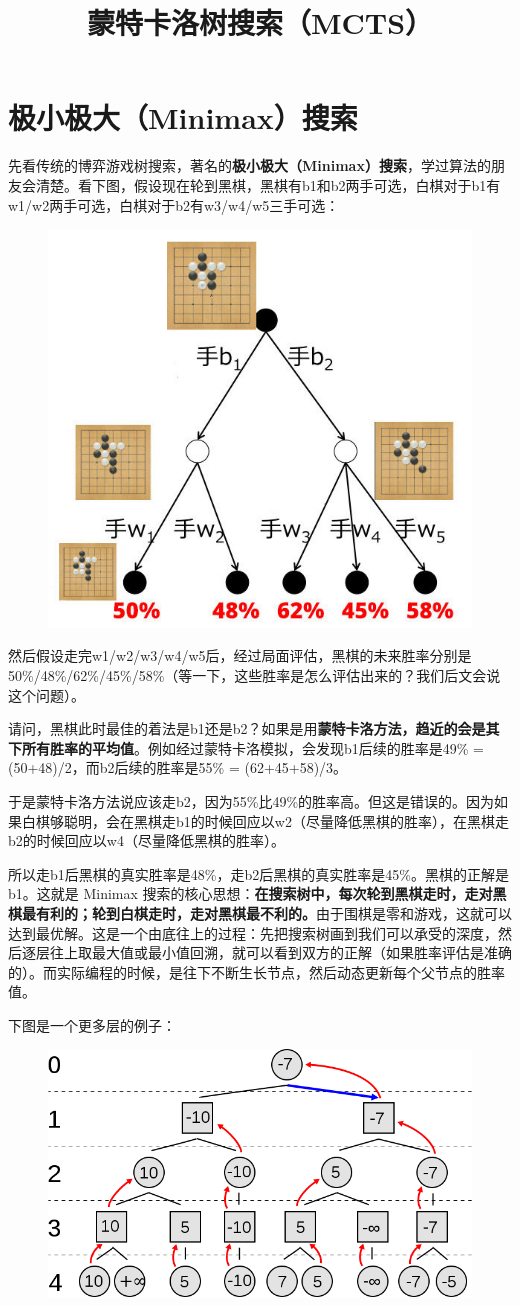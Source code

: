 \documentclass[12pt]{article}
\title{蒙特卡洛树搜索（MCTS）\cite{Fundation_Of_MCTS_In_28_Days}\cite{MCTS_Introduction_Briefly}}
\begin{document}
\maketitle

\section{极小极大（Minimax）搜索}
先看传统的博弈游戏树搜索，著名的\textbf{极小极大（Minimax）搜索}，学过算法的朋友会清楚。看下图，假设现在轮到黑棋，黑棋有b1和b2两手可选，白棋对于b1有w1/w2两手可选，白棋对于b2有w3/w4/w5三手可选：
\begin{figure}[H]
    \centering
    \includegraphics[width=.5\textwidth]{fig/MCTS-Minimax-Search-Example.jpg}
\end{figure}

然后假设走完w1/w2/w3/w4/w5后，经过局面评估，黑棋的未来胜率分别是 50\%/48\%/62\%/45\%/58\%（等一下，这些胜率是怎么评估出来的？我们后文会说这个问题）。

请问，黑棋此时最佳的着法是b1还是b2？如果是用\textbf{蒙特卡洛方法，趋近的会是其下所有胜率的平均值}。例如经过蒙特卡洛模拟，会发现b1后续的胜率是49\% = (50+48)/2，而b2后续的胜率是55\% = (62+45+58)/3。

于是蒙特卡洛方法说应该走b2，因为55\%比49\%的胜率高。但这是错误的。因为如果白棋够聪明，会在黑棋走b1的时候回应以w2（尽量降低黑棋的胜率），在黑棋走b2的时候回应以w4（尽量降低黑棋的胜率）。

所以走b1后黑棋的真实胜率是48\%，走b2后黑棋的真实胜率是45\%。黑棋的正解是b1。这就是 Minimax 搜索的核心思想：\textbf{在搜索树中，每次轮到黑棋走时，走对黑棋最有利的；轮到白棋走时，走对黑棋最不利的。}由于围棋是零和游戏，这就可以达到最优解。这是一个由底往上的过程：先把搜索树画到我们可以承受的深度，然后逐层往上取最大值或最小值回溯，就可以看到双方的正解（如果胜率评估是准确的）。而实际编程的时候，是往下不断生长节点，然后动态更新每个父节点的胜率值。

下图是一个更多层的例子：
\begin{figure}[H]
    \centering
    \includegraphics[width=.5\textwidth]{fig/MCTS-Minimax-Search-Multiple-Layers.png}
\end{figure}
\end{document}
